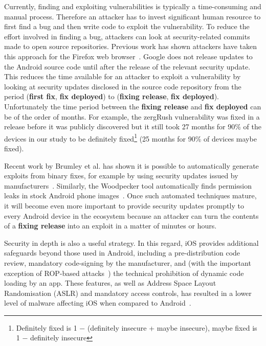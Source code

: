 \documentclass[conference,a4paper,twoside]{IEEEtran}
\begin{document}
Currently, finding and exploiting vulnerabilities is typically a time-consuming and manual process.
Therefore an attacker has to invest significant human resource to first find a bug and then write code to exploit the vulnerability.
To reduce the effort involved in finding a bug, attackers can look at security-related commits made to open source repositories.
Previous work has shown attackers have taken this approach for the Firefox web browser~\cite{Barth2011}.
Google does not release updates to the Android source code until after the release of the relevant security update.
This reduces the time available for an attacker to exploit a vulnerability by looking at security updates disclosed in the source code repository from the period (\textbf{first fix}, \textbf{fix deployed}) to (\textbf{fixing release}, \textbf{fix deployed}).
Unfortunately the time period between the \textbf{fixing release} and \textbf{fix deployed} can be of the order of months. 
For example, the zergRush vulnerability was fixed in a release before it was publicly discovered but it still took 27 months for 90\% of the devices in our study to be definitely fixed\footnote{Definitely fixed is 1 $-$ (definitely insecure + maybe insecure), maybe fixed is 1 $-$ definitely insecure} (25 months for 90\% of devices maybe fixed).

Recent work by Brumley et al. has shown it is possible to automatically generate exploits from binary fixes, for example by using security updates issued by manufacturers~\cite{Brumley2008}. 
Similarly, the Woodpecker tool automatically finds permission leaks in stock Android phone images~\cite{Grace2012}.
Once such automated techniques mature, it will become even more important to provide security updates promptly to every Android device in the ecosystem because an attacker can turn the contents of a \textbf{fixing release} into an exploit in a matter of minutes or hours.

Security in depth is also a useful strategy.
In this regard, iOS provides additional safeguards beyond those used in Android, including a pre-distribution code review, mandatory code-signing by the manufacturer, and (with the important exception of ROP-based attacks~\cite{Wang2013a}) the technical prohibition of dynamic code loading by an app.
These features, as well as Address Space Layout Randomisation (ASLR) and mandatory access controls, has resulted in a lower level of malware affecting iOS when compared to Android~\cite{Felt2011}.
\end{document}
